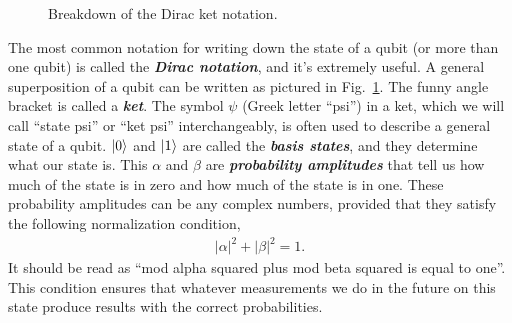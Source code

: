 \begin{figure}[H]
    \centering
    
    \caption[Dirac ket notation.]{Breakdown of the Dirac ket notation.}
    \label{fig:ket-notation}
\end{figure}

The most common notation for writing down the state of a qubit (or more than one qubit) is called the \textbf{\emph{Dirac notation}}, and it's extremely useful.
A general superposition of a qubit can be written as pictured in Fig.~\ref{fig:ket-notation}.
The funny angle bracket \ket{\cdot} is called a \textbf{\emph{ket}}. The symbol $\psi$ (Greek letter ``psi'') in a ket, which we will call ``state psi'' or ``ket psi'' interchangeably, is often used to describe a general state of a qubit. $\left| 0 \right\rangle$ and $\left| 1 \right\rangle$ are called the \textbf{\emph{basis states}}, and they determine what our state is. This $\alpha$ and $\beta$ are \textbf{\emph{probability amplitudes}} that tell us how much of the state is in zero and how much of the state is in one.  These probability amplitudes can be any complex numbers, provided that they satisfy the following normalization condition,
\begin{align}
    |\alpha|^2 + |\beta|^2 = 1.
    \label{eq:normalization-condition}
\end{align}
It should be read as ``mod alpha squared plus mod beta squared is equal to one''. This condition ensures that whatever measurements we do in the future on this state produce results with the correct probabilities.



